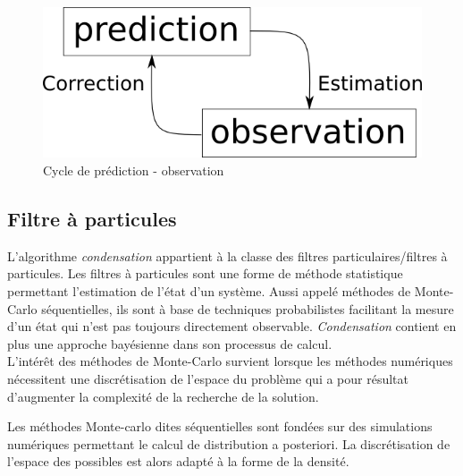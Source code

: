\documentclass[a4paper,12pt]{report}
\begin{document}
\begin{figure}[hbtp]

\includegraphics[scale=0.5]{figurePredictionObservationCycle.png}
\centering
\caption{Cycle de prédiction - observation}
\end{figure}

\subsection{Filtre à particules}
L'algorithme \textit{condensation} appartient à la classe des filtres particulaires/filtres à particules. Les filtres à particules sont une forme de méthode statistique permettant l'estimation de l'état d'un système.  Aussi appelé méthodes  de Monte-Carlo séquentielles, ils sont à base de techniques probabilistes facilitant la mesure d'un état qui n'est pas toujours directement observable.
\textit{Condensation} contient en plus une approche bayésienne dans son processus de calcul.\\

L'intérêt des méthodes de Monte-Carlo survient lorsque les méthodes numériques nécessitent une discrétisation de l'espace du problème qui a pour résultat d'augmenter la complexité de la recherche de la solution.

Les méthodes Monte-carlo dites séquentielles sont fondées sur des simulations numériques permettant le calcul de distribution a posteriori. La discrétisation de l'espace des possibles est alors adapté à la forme de la densité.
\end{document}
